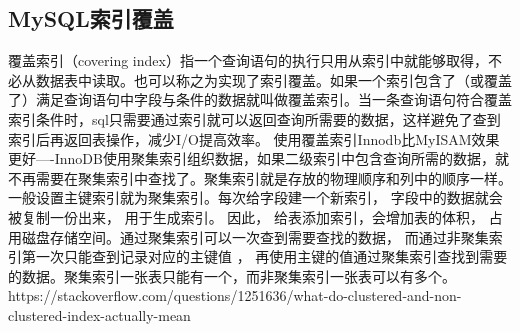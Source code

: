 \documentclass[../../../interview-questions.tex]{subfiles}
\begin{document}
\subsection{MySQL索引覆盖}

覆盖索引（covering index）指一个查询语句的执行只用从索引中就能够取得，不必从数据表中读取。也可以称之为实现了索引覆盖。如果一个索引包含了（或覆盖了）满足查询语句中字段与条件的数据就叫做覆盖索引。当一条查询语句符合覆盖索引条件时，sql只需要通过索引就可以返回查询所需要的数据，这样避免了查到索引后再返回表操作，减少I/O提高效率。
使用覆盖索引Innodb比MyISAM效果更好----InnoDB使用聚集索引组织数据，如果二级索引中包含查询所需的数据，就不再需要在聚集索引中查找了。聚集索引就是存放的物理顺序和列中的顺序一样。一般设置主键索引就为聚集索引。每次给字段建一个新索引， 字段中的数据就会被复制一份出来， 用于生成索引。 因此， 给表添加索引，会增加表的体积， 占用磁盘存储空间。通过聚集索引可以一次查到需要查找的数据， 而通过非聚集索引第一次只能查到记录对应的主键值 ， 再使用主键的值通过聚集索引查找到需要的数据。聚集索引一张表只能有一个，而非聚集索引一张表可以有多个。https://stackoverflow.com/questions/1251636/what-do-clustered-and-non-clustered-index-actually-mean
\end{document}
